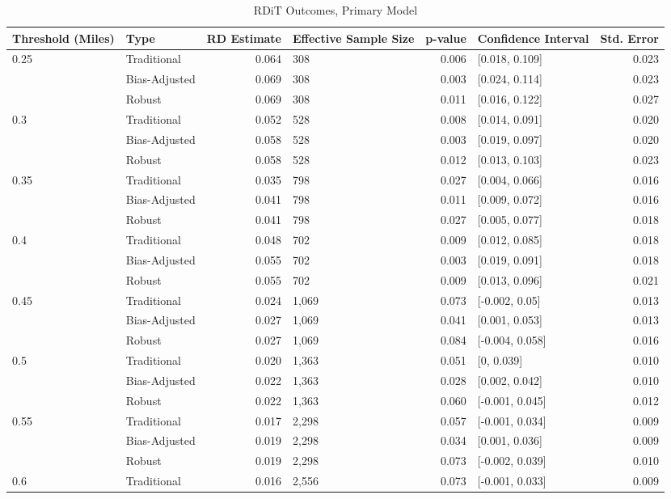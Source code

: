 \documentclass[
  12pt,
]{article}
\begin{document}
\begin{singlespace}
\begin{table}[H]
\caption{\label{tab:big-tab}\label{tab:big-tab} RDiT Outcomes, Primary Model}
\centering
\begin{tabular}[t]{llrlrlr}
\toprule
Threshold (Miles) & Type & RD Estimate & Effective Sample Size & p-value & Confidence
Interval & Std. Error\\
\midrule
0.25 & Traditional & 0.064 & 308 & 0.006 & {}[0.018, 0.109] & 0.023\\
 & Bias-Adjusted & 0.069 & 308 & 0.003 & {}[0.024, 0.114] & 0.023\\
 & Robust & 0.069 & 308 & 0.011 & {}[0.016, 0.122] & 0.027\\
0.3 & Traditional & 0.052 & 528 & 0.008 & {}[0.014, 0.091] & 0.020\\
 & Bias-Adjusted & 0.058 & 528 & 0.003 & {}[0.019, 0.097] & 0.020\\
 & Robust & 0.058 & 528 & 0.012 & {}[0.013, 0.103] & 0.023\\
0.35 & Traditional & 0.035 & 798 & 0.027 & {}[0.004, 0.066] & 0.016\\
 & Bias-Adjusted & 0.041 & 798 & 0.011 & {}[0.009, 0.072] & 0.016\\
 & Robust & 0.041 & 798 & 0.027 & {}[0.005, 0.077] & 0.018\\
0.4 & Traditional & 0.048 & 702 & 0.009 & {}[0.012, 0.085] & 0.018\\
 & Bias-Adjusted & 0.055 & 702 & 0.003 & {}[0.019, 0.091] & 0.018\\
 & Robust & 0.055 & 702 & 0.009 & {}[0.013, 0.096] & 0.021\\
0.45 & Traditional & 0.024 & 1,069 & 0.073 & {}[-0.002, 0.05] & 0.013\\
 & Bias-Adjusted & 0.027 & 1,069 & 0.041 & {}[0.001, 0.053] & 0.013\\
 & Robust & 0.027 & 1,069 & 0.084 & {}[-0.004, 0.058] & 0.016\\
0.5 & Traditional & 0.020 & 1,363 & 0.051 & {}[0, 0.039] & 0.010\\
 & Bias-Adjusted & 0.022 & 1,363 & 0.028 & {}[0.002, 0.042] & 0.010\\
 & Robust & 0.022 & 1,363 & 0.060 & {}[-0.001, 0.045] & 0.012\\
0.55 & Traditional & 0.017 & 2,298 & 0.057 & {}[-0.001, 0.034] & 0.009\\
 & Bias-Adjusted & 0.019 & 2,298 & 0.034 & {}[0.001, 0.036] & 0.009\\
 & Robust & 0.019 & 2,298 & 0.073 & {}[-0.002, 0.039] & 0.010\\
0.6 & Traditional & 0.016 & 2,556 & 0.073 & {}[-0.001, 0.033] & 0.009\\

\end{tabular}
\end{table}
\end{singlespace}
\end{document}
